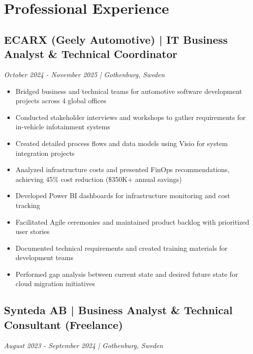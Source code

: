 \documentclass[11pt,a4paper]{article}
\begin{document}
\section*{Professional Experience}

\subsection*{ECARX (Geely Automotive) | IT Business Analyst \& Technical Coordinator}
\textit{October 2024 - November 2025 | Gothenburg, Sweden}

\begin{itemize}[leftmargin=*, itemsep=2pt]
\item Bridged business and technical teams for automotive software development projects across 4 global offices
\item Conducted stakeholder interviews and workshops to gather requirements for in-vehicle infotainment systems
\item Created detailed process flows and data models using Visio for system integration projects
\item Analyzed infrastructure costs and presented FinOps recommendations, achieving 45\% cost reduction (\$350K+ annual savings)
\item Developed Power BI dashboards for infrastructure monitoring and cost tracking
\item Facilitated Agile ceremonies and maintained product backlog with prioritized user stories
\item Documented technical requirements and created training materials for development teams
\item Performed gap analysis between current state and desired future state for cloud migration initiatives
\end{itemize}

\subsection*{Synteda AB | Business Analyst \& Technical Consultant (Freelance)}
\textit{August 2023 - September 2024 | Gothenburg, Sweden}
\end{document}
